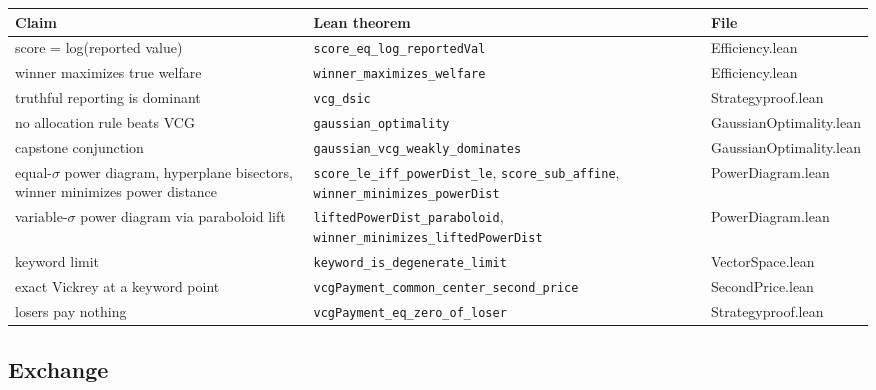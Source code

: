 {\def\LTcaptype{none} %
\begin{longtable}[]{@{}
  >{\raggedright\arraybackslash}p{}
  >{\raggedright\arraybackslash}p{}
  >{\raggedright\arraybackslash}p{}@{}}
\toprule\noalign{}
\begin{minipage}[b]{\linewidth}\raggedright
Claim
\end{minipage} & \begin{minipage}[b]{\linewidth}\raggedright
Lean theorem
\end{minipage} & \begin{minipage}[b]{\linewidth}\raggedright
File
\end{minipage} \\
\midrule\noalign{}
\endhead
\bottomrule\noalign{}
\endlastfoot
score = log(reported value) & \texttt{score\_eq\_log\_reportedVal} &
Efficiency.lean \\
winner maximizes true welfare & \texttt{winner\_maximizes\_welfare} &
Efficiency.lean \\
truthful reporting is dominant & \texttt{vcg\_dsic} &
Strategyproof.lean \\
no allocation rule beats VCG & \texttt{gaussian\_optimality} &
GaussianOptimality.lean \\
capstone conjunction & \texttt{gaussian\_vcg\_weakly\_dominates} &
GaussianOptimality.lean \\
equal-\(\sigma\) power diagram, hyperplane bisectors, winner minimizes
power distance & \texttt{score\_le\_iff\_powerDist\_le},
\texttt{score\_sub\_affine}, \texttt{winner\_minimizes\_powerDist} &
PowerDiagram.lean \\
variable-\(\sigma\) power diagram via paraboloid lift &
\texttt{liftedPowerDist\_paraboloid},
\texttt{winner\_minimizes\_liftedPowerDist} & PowerDiagram.lean \\
keyword limit & \texttt{keyword\_is\_degenerate\_limit} &
VectorSpace.lean \\
exact Vickrey at a keyword point &
\texttt{vcgPayment\_common\_center\_second\_price} & SecondPrice.lean \\
losers pay nothing & \texttt{vcgPayment\_eq\_zero\_of\_loser} &
Strategyproof.lean \\
\end{longtable}
}

\subsection*{Exchange}\label{exchange}


